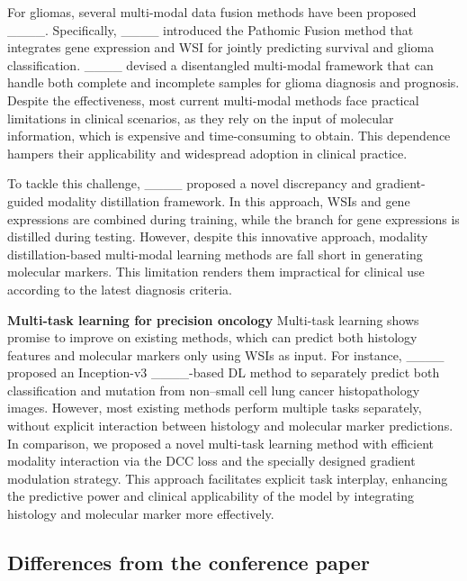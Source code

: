 For gliomas, several multi-modal data fusion methods have  been proposed ____. Specifically, ____ introduced the Pathomic Fusion method that integrates gene expression  and WSI for jointly predicting survival and glioma classification. ____ devised a disentangled multi-modal framework that can handle both complete and incomplete samples for glioma diagnosis and prognosis.  Despite the effectiveness, most current multi-modal methods face practical limitations in clinical scenarios, as they  rely on the input of molecular information, which is expensive and time-consuming to obtain. This dependence hampers their applicability and widespread adoption in clinical practice.


To tackle this challenge, ____ proposed a novel discrepancy and gradient-guided modality distillation framework. In this approach, WSIs and gene expressions are combined during training, while the branch for gene expressions is distilled during testing. However, despite this innovative approach, modality distillation-based multi-modal learning methods are fall short in  generating molecular markers. This limitation renders them impractical for clinical use according to the latest diagnosis criteria. 



\noindent\textbf{Multi-task learning for precision oncology}
Multi-task learning shows promise to improve on existing methods, which can predict both histology features and molecular markers only using WSIs as input. For instance, ____ proposed an Inception-v3 ____-based DL method to separately predict both classification and mutation from non–small cell lung cancer histopathology images. However, most existing methods perform multiple tasks separately, without explicit interaction between histology and molecular marker predictions. In comparison, we proposed a novel multi-task learning method with efficient modality interaction via the DCC loss and the specially designed gradient modulation strategy. This approach facilitates explicit task interplay, enhancing the predictive power and clinical applicability of the model by integrating histology and molecular marker more effectively.


\vspace{-.5em}
\subsection{Differences from the conference paper}

